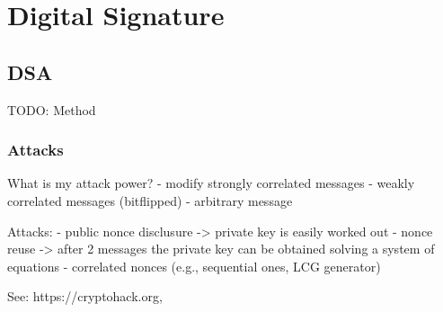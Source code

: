 \chapter{Digital Signature}

\section{DSA}
TODO: Method

\subsection{Attacks}
What is my attack power?
 - modify strongly correlated messages
 - weakly correlated messages (bitflipped)
 - arbitrary message

Attacks:
- public nonce disclusure -> private key is easily worked out
- nonce reuse -> after 2 messages the private key can be obtained solving a system of equations
- correlated nonces (e.g., sequential ones, LCG generator)

See: https://cryptohack.org, 